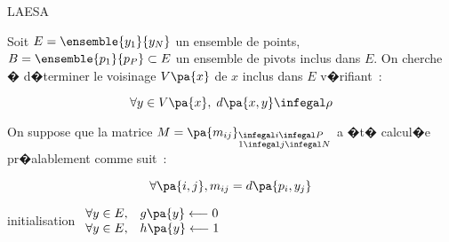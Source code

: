             \begin{xalgorithm}{LAESA}
            \label{space_metric_algo_laesa}
            
            Soit $E = \ensemble{y_1}{y_N}$ un ensemble de points, $B = \ensemble{p_1}{p_P} \subset E$ 
            un ensemble de pivots inclus dans $E$. On cherche � d�terminer le voisinage $V\pa{x}$ de $x$ 
            inclus dans $E$ v�rifiant~:
            
                        $$
                        \forall y \in V\pa{x}, \; d\pa{x,y} \infegal \rho
                        $$
                        
            On suppose que la matrice $M = \pa{m_{ij}}_ { \begin{subarray} 1 \infegal i \infegal P \\ 
            1 \infegal j \infegal N \end{subarray} }$ a �t� calcul�e pr�alablement comme suit~:
            
                        $$
                        \forall \pa{i,j}, m_{ij} = d\pa{p_i, y_j}
                        $$
                        
            \begin{xalgostep}{initialisation}
                $\begin{array}{ll}
                \forall y \in E, & g\pa{y} \longleftarrow 0 \\
                \forall y \in E, & h\pa{y} \longleftarrow 1
                \end{array}$
            \end{xalgostep}        
            

\end{xalgorithm}
